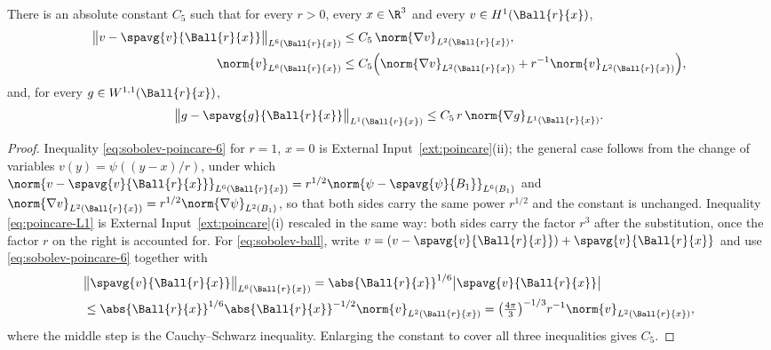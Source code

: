 \documentclass[11pt,reqno]{amsart}
\begin{document}
\begin{lemma}\label{lem:sobolev-poincare-ball}
There is an absolute constant $C_{5}$ such that for every $r>0$, every
$x\in\R^{3}$ and every $v\in H^{1}(\Ball{r}{x})$,
\begin{align}
  \bigl\|v-\spavg{v}{\Ball{r}{x}}\bigr\|_{L^{6}(\Ball{r}{x})}
    &\le C_{5}\,\norm{\nabla v}_{L^{2}(\Ball{r}{x})},
    \label{eq:sobolev-poincare-6}\\
  \norm{v}_{L^{6}(\Ball{r}{x})}
    &\le C_{5}\Bigl(\norm{\nabla v}_{L^{2}(\Ball{r}{x})}
       +r^{-1}\norm{v}_{L^{2}(\Ball{r}{x})}\Bigr),
    \label{eq:sobolev-ball}
\end{align}
and, for every $g\in W^{1,1}(\Ball{r}{x})$,
\begin{equation}\label{eq:poincare-L1}
  \bigl\|g-\spavg{g}{\Ball{r}{x}}\bigr\|_{L^{1}(\Ball{r}{x})}
  \le C_{5}\,r\,\norm{\nabla g}_{L^{1}(\Ball{r}{x})} .
\end{equation}
\end{lemma}

\begin{proof}
Inequality \eqref{eq:sobolev-poincare-6} for $r=1$, $x=0$ is
External Input~\ref{ext:poincare}(ii); the general case follows from the change
of variables $v(y)=\psi((y-x)/r)$, under which
$\norm{v-\spavg{v}{\Ball{r}{x}}}_{L^{6}(\Ball{r}{x})}
 =r^{1/2}\norm{\psi-\spavg{\psi}{B_{1}}}_{L^{6}(B_{1})}$ and
$\norm{\nabla v}_{L^{2}(\Ball{r}{x})}=r^{1/2}\norm{\nabla\psi}_{L^{2}(B_{1})}$,
so that both sides carry the same power $r^{1/2}$ and the constant is unchanged.
Inequality \eqref{eq:poincare-L1} is External Input~\ref{ext:poincare}(i)
rescaled in the same way: both sides carry the factor $r^{3}$ after the
substitution, once the factor $r$ on the right is accounted for. For
\eqref{eq:sobolev-ball}, write $v=(v-\spavg{v}{\Ball{r}{x}})+\spavg{v}{\Ball{r}{x}}$
and use \eqref{eq:sobolev-poincare-6} together with
\[\begin{aligned}
  &\bigl\|\spavg{v}{\Ball{r}{x}}\bigr\|_{L^{6}(\Ball{r}{x})}
  =\abs{\Ball{r}{x}}^{1/6}\bigl|\spavg{v}{\Ball{r}{x}}\bigr|
  \\ &\le\abs{\Ball{r}{x}}^{1/6}\abs{\Ball{r}{x}}^{-1/2}\norm{v}_{L^{2}(\Ball{r}{x})}
  =\bigl(\tfrac{4\pi}{3}\bigr)^{-1/3}r^{-1}\norm{v}_{L^{2}(\Ball{r}{x})},
\end{aligned}\]
where the middle step is the Cauchy--Schwarz inequality. Enlarging the constant
to cover all three inequalities gives $C_{5}$.
\end{proof}
\end{document}
